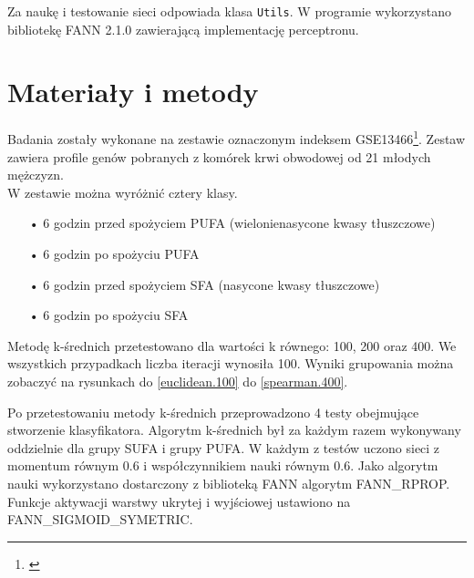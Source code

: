\documentclass{classrep}
\begin{document}
Za naukę i testowanie sieci odpowiada klasa \verb+Utils+. W programie wykorzystano bibliotekę FANN 2.1.0 zawierającą implementację perceptronu.

\section{Materiały i metody}
Badania zostały wykonane na zestawie oznaczonym indeksem GSE13466\footnote{\cite{research}}. Zestaw zawiera profile genów pobranych z komórek krwi obwodowej od 21 młodych mężczyzn. \\W zestawie można wyróżnić cztery klasy.
\begin{itemize}
\item[•] 6 godzin przed spożyciem PUFA (wielonienasycone kwasy tłuszczowe)
\item[•] 6 godzin po spożyciu PUFA
\item[•] 6 godzin przed spożyciem SFA (nasycone kwasy tłuszczowe)
\item[•] 6 godzin po spożyciu SFA\\
\end{itemize}

Metodę k-średnich przetestowano dla wartości k równego: 100, 200 oraz 400. We wszystkich przypadkach liczba iteracji wynosiła 100. Wyniki grupowania można zobaczyć na rysunkach do \ref{euclidean.100} do \ref{spearman.400}.

Po przetestowaniu metody k-średnich przeprowadzono 4 testy obejmujące stworzenie klasyfikatora. Algorytm k-średnich był za każdym razem wykonywany oddzielnie dla grupy SUFA i grupy PUFA. W każdym z testów uczono sieci z momentum równym 0.6 i współczynnikiem nauki równym 0.6. Jako algorytm nauki wykorzystano dostarczony z biblioteką FANN algorytm FANN\_RPROP. Funkcje aktywacji warstwy ukrytej i wyjściowej ustawiono na FANN\_SIGMOID\_SYMETRIC.
\end{document}
